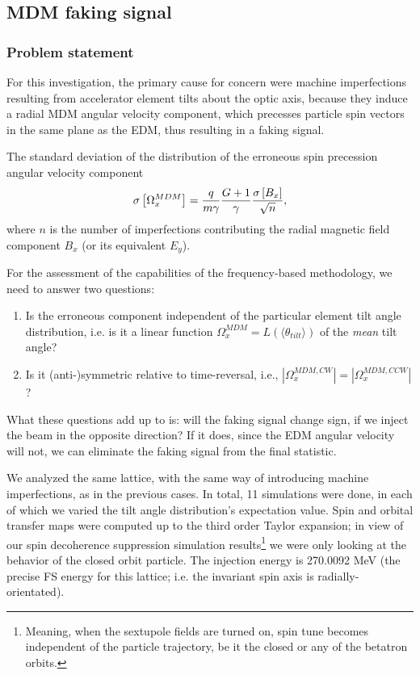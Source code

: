 \documentclass[preprint, review]{elsarticle}
\newcommand{\W}{\Omega}
\newcommand{\SD}[1]{\sigma\bkt*{#1}}
\newcommand{\avg}[1]{\langle{#1}\rangle}
\begin{document}
\subsection{MDM faking signal}
\subsubsection{Problem statement}
For this investigation, the primary cause for concern were machine imperfections resulting from
accelerator element tilts about the optic axis, because they induce a radial MDM angular velocity component,
which precesses particle spin vectors in the same plane as the EDM, thus resulting in a faking signal.

The standard deviation of the distribution of the erroneous spin precession angular velocity component
\begin{equation}\label{eq:MDM_freq_SD}
  \SD{\W_x^{MDM}} = \frac{q}{m\gamma} \frac{G+1}{\gamma}\frac{\SD{B_x}}{\sqrt{n}},
\end{equation}
where $n$ is the number of imperfections contributing the radial magnetic field component $B_x$
(or its equivalent $E_y$).



For the assessment of the capabilities of the frequency-based methodology, we need to answer two questions:
\begin{enumerate}[(1)]
\item Is the erroneous component independent of the particular element tilt angle distribution, i.e. is it
  a linear function $\W_x^{MDM} = L(\avg{\theta_{tilt}})$ of the \emph{mean} tilt angle?
  \item Is it (anti-)symmetric relative to time-reversal, i.e., $|\W_x^{MDM,CW}| = |\W_x^{MDM,CCW}|$?
\end{enumerate}
What these questions add up to is: will the faking signal change sign, if we inject the beam in the opposite
direction? If it does, since the EDM angular velocity will not, we can eliminate the faking signal
from the final statistic.

We analyzed the same lattice, with the same way of introducing machine imperfections, as in the previous cases.
In total, 11 simulations were done, in each of which we varied the tilt angle distribution's expectation value.
Spin and orbital transfer maps were computed up to the third order Taylor expansion; in view of
our spin decoherence suppression simulation results\footnote{Meaning, when the sextupole fields are turned on,
  spin tune becomes independent of the particle trajectory, be it the closed or any of the betatron orbits.}
we were only looking at the behavior of the closed orbit particle.
The injection energy is 270.0092 MeV (the precise FS energy for this lattice; i.e.
the invariant spin axis is radially-orientated).
\end{document}
